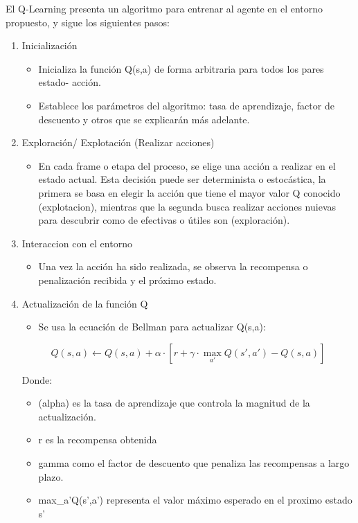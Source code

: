 El Q-Learning presenta un algoritmo para entrenar al agente en el entorno propuesto, y sigue los siguientes pasos:
\begin{enumerate}
	\item Inicialización
		\begin{itemize}
			\item Inicializa la función Q(s,a) de forma arbitraria para todos los pares estado-	acción.\newline
			\item Establece los parámetros del algoritmo: tasa de aprendizaje, factor de descuento y 	otros que se explicarán más adelante.\newline
		\end{itemize}

	\item Exploración/ Explotación (Realizar acciones)
		\begin{itemize}
			\item En cada frame o etapa del proceso, se elige una acción a realizar en el estado 	actual. Esta decisión puede ser determinista o estocástica, la primera se basa en 	elegir la acción que tiene el mayor valor Q conocido (explotacion), mientras que la 	segunda busca realizar acciones nuievas para descubrir como de efectivas o útiles son 	(exploración).
		\end{itemize}

	\item Interaccion con el entorno
		\begin{itemize}
			\item Una vez la acción ha sido realizada, se observa la recompensa o penalización 	recibida y el próximo estado.
	    \end{itemize}

	\item Actualización de la función Q
		\begin{itemize}
			\item Se usa la ecuación de Bellman para actualizar Q(s,a):
		\end{itemize}
		\begin{equation}
		Q(s, a) \leftarrow Q(s, a) + \alpha \cdot \left[ r + \gamma \cdot \max_{a'} 		Q(s', a') - Q(s, a) \right]
		\end{equation}

		Donde:
		\begin{itemize}
			\item(alpha) es la tasa de aprendizaje que controla la magnitud de la actualización.
			\item r es la recompensa obtenida
			\item gamma como el factor de descuento que penaliza las recompensas a largo plazo.
			\item max_a'Q(s',a') representa el valor máximo esperado en el proximo estado s'
		\end{itemize}


\end{enumerate}
